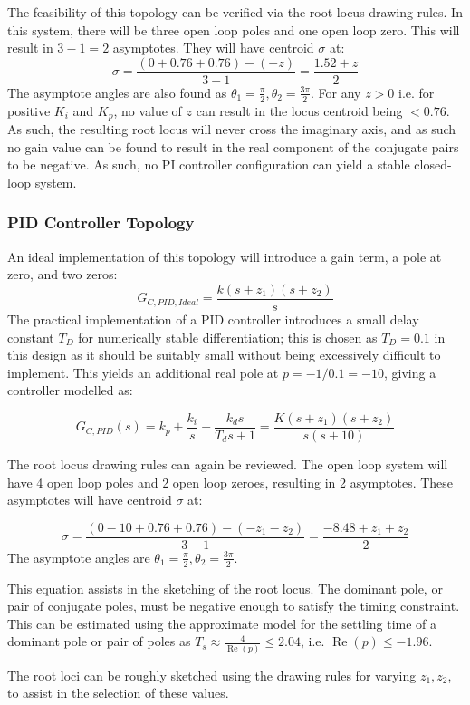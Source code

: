 \documentclass[11pt,a4paper]{article}
\begin{document}
The feasibility of this topology can be verified via the root locus drawing rules. In this system, there will be three open loop poles and one open loop zero. This will result in $3 - 1 = 2$ asymptotes. They will have centroid $\sigma$ at:
$$
\sigma = \frac{(0+0.76+0.76)-(-z)}{3-1}
=\frac{1.52+z}{2}
$$
The asymptote angles are also found as $\theta_1 = \frac{\pi}{2}, \theta_2 = \frac{3\pi}{2}$. For any $z > 0$ i.e. for positive $K_i$ and $K_p$, no value of $z$ can result in the locus centroid being $< 0.76$. As such, the resulting root locus will never cross the imaginary axis, and as such no gain value can be found to result in the real component of the conjugate pairs to be negative. As such, no PI controller configuration can yield a stable closed-loop system.

\subsubsection{PID Controller Topology}
An ideal implementation of this topology will introduce a gain term, a pole at zero, and two zeros:
$$
G_{C, PID, Ideal} = \frac{k (s + z_1)(s + z_2)}{s}
$$
The practical implementation of a PID controller introduces a small delay constant $T_D$ for numerically stable differentiation; this is chosen as $T_D = 0.1$ in this design as it should be suitably small without being excessively difficult to implement. This yields an additional real pole at $p = -1/0.1 = -10$, giving a controller modelled as:

$$
G_{C,PID}(s)
=k_p+\frac{k_i}{s}+\frac{k_ds}{T_ds+1}
=\frac{K(s+z_1)(s+z_2)}{s(s+10)}
$$

The root locus drawing rules can again be reviewed. The open loop system will have 4 open loop poles and 2 open loop zeroes, resulting in 2 asymptotes. These asymptotes will have centroid $\sigma$ at:

$$
\sigma = \frac{(0 - 10 + 0.76 + 0.76)-(-z_1 - z_2)}{3-1}
=\frac{-8.48 +  z_1 + z_2}{2}
$$
The asymptote angles are $\theta_1 = \frac{\pi}{2}, \theta_2 = \frac{3\pi}{2}$.

This equation assists in the sketching of the root locus. The dominant pole, or pair of conjugate poles, must be negative enough to satisfy the timing constraint. This can be estimated using the approximate model for the settling time of a dominant pole or pair of poles as $
T_s\approx\frac{4}{\operatorname{Re}(p)}\leq2.04
$, i.e. $\operatorname{Re}(p)\leq-1.96$. 

The root loci can be roughly sketched using the drawing rules for varying $z_1, z_2$, to assist in the selection of these values. 
\end{document}
